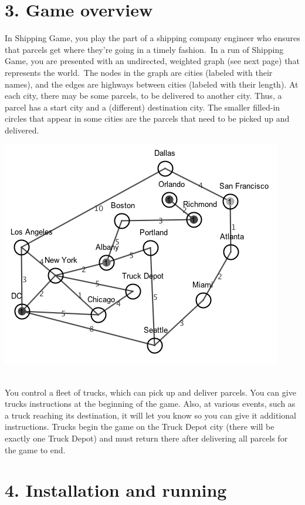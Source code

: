 \documentclass[11pt]{article}
\begin{document}
\section{3. Game overview}
In Shipping Game, you play the part of a shipping company engineer who ensures that parcels get where they're going in a timely fashion.\ In a run of Shipping Game, you are presented with an undirected, weighted graph (see next page) that represents the world.\ The nodes in the graph are cities (labeled with their names), and the edges are highways between cities (labeled with their length). At each city, there may be some parcels, to be delivered to another city. Thus, a parcel has a start city and a (different) destination city.
The smaller filled-in circles that appear in some cities are the parcels that need to be picked up and delivered.\\
\centerline{\includegraphics[scale=0.8]{map1.png}}\\

You control a fleet of trucks, which can pick up and deliver parcels. You can give trucks instructions at the beginning of the game.
Also, at various events, such as a truck reaching its destination, it will let you know so you can give it additional instructions.
Trucks begin the game on the Truck Depot city (there will be exactly one Truck Depot) and must return there after delivering all parcels for the game to end.

\section{4. Installation and running}
\end{document}
